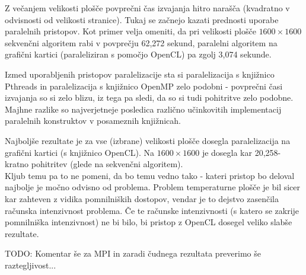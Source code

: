 \documentclass[a4paper,titlepage,11pt]{article}
\begin{document}
Z večanjem velikosti plošče povprečni čas izvajanja hitro narašča (kvadratno v odvisnosti od velikosti stranice). Tukaj se začnejo kazati prednosti uporabe paralelnih pristopov. Kot primer velja omeniti, da pri velikosti plošče $1600 \times 1600$ sekvenčni algoritem rabi v povprečju 62,272 sekund, paralelni algoritem na grafični kartici (paraleliziran s pomočjo OpenCL) pa zgolj 3,074 sekunde.

Izmed uporabljenih pristopov paralelizacije sta si paralelizacija s knjižnico Pthreads in paralelizacija s knjižnico OpenMP zelo podobni - povprečni časi izvajanja so si zelo blizu, iz tega pa sledi, da so si tudi pohitritve zelo podobne. Majhne razlike so najverjetneje posledica različno učinkovitih implementacij paralelnih konstruktov v posameznih knjižnicah.

Najboljše rezultate je za vse (izbrane) velikosti plošče dosegla paralelizacija na grafični kartici (s knjižnico OpenCL). Na $1600 \times 1600$ je dosegla kar 20,258-kratno pohitritev (glede na sekvenčni algoritem). \\
Kljub temu pa to ne pomeni, da bo temu vedno tako - kateri pristop bo deloval najbolje je močno odvisno od problema. Problem temperaturne plošče je bil sicer kar zahteven z vidika pomnilniških dostopov, vendar je to dejstvo zasenčila računska intenzivnost problema. Če te računske intenzivnosti (s katero se zakrije pomnilniška intenzivnost) ne bi bilo, bi pristop z OpenCL dosegel veliko slabše rezultate.

TODO: Komentar še za MPI in zaradi čudnega rezultata preverimo še raztegljivost...
\end{document}
